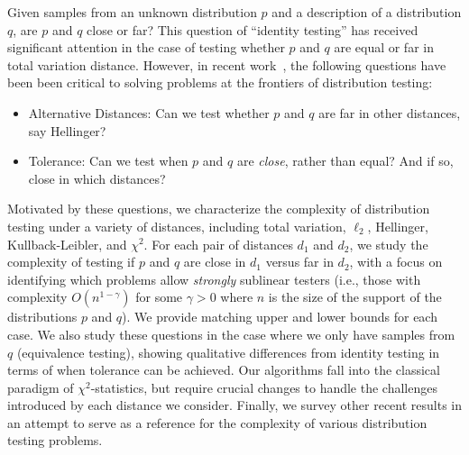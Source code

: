 Given samples from an unknown distribution $p$ and a description of a distribution $q$, are $p$ and $q$ close or far?
This question of ``identity testing'' has received significant attention in the case of testing whether $p$ and $q$ are equal or far in total variation distance.
However, in recent work~\cite{ValiantV11a, AcharyaDK15, DaskalakisP17}, the following questions have been been critical to solving problems at the frontiers of distribution testing:
\begin{itemize}
\item Alternative Distances: Can we test whether $p$ and $q$ are far in other distances, say Hellinger?
\item Tolerance: Can we test when $p$ and $q$ are \emph{close}, rather than equal? And if so, close in which distances?
\end{itemize}

Motivated by these questions, we characterize the complexity of distribution testing under a variety of distances, including total variation, $\ell_2$, Hellinger, Kullback-Leibler, and $\chi^2$.
For each pair of distances $d_1$ and $d_2$, we study the complexity of testing if $p$ and $q$ are close in $d_1$ versus far in $d_2$, with a focus on identifying which problems allow \emph{strongly} sublinear testers (i.e., those with complexity $O(n^{1 - \gamma})$ for some $\gamma > 0$ where $n$ is the size of the support of the distributions $p$ and $q$).
We provide matching upper and lower bounds for each case.
We also study these questions in the case where we only have samples from $q$ (equivalence testing), showing qualitative differences from identity testing in terms of when tolerance can be achieved.
Our algorithms fall into the classical paradigm of $\chi^2$-statistics, but require crucial changes to handle the challenges introduced by each distance we consider.
Finally, we survey other recent results in an attempt to serve as a reference for the complexity of various distribution testing problems.
